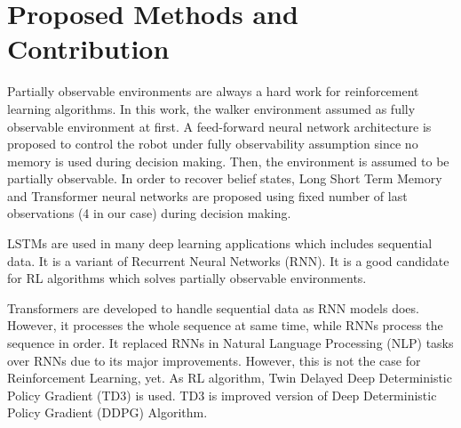 \section{Proposed Methods and Contribution}
\label{sec:proposed_methods}

Partially observable environments are always a hard work for reinforcement learning algorithms. 
In this work, the walker environment assumed as fully observable environment at first. 
A feed-forward neural network architecture is proposed to control 
the robot under fully observability assumption since no memory is used during decision making. 
Then, the environment is assumed to be partially observable. 
In order to recover belief states, Long Short Term Memory and 
Transformer neural networks are proposed using fixed number of 
last observations (4 in our case) during decision making. 

LSTMs are used in many deep learning applications which includes sequential data. 
It is a variant of Recurrent Neural Networks (RNN). 
It is a good candidate for RL algorithms which solves partially observable environments. 

Transformers are developed to handle sequential data as RNN models does. 
However, it processes the whole sequence at same time, while RNNs process the sequence in order. 
It replaced RNNs in Natural Language Processing (NLP) tasks over RNNs due to its major improvements. 
However, this is not the case for Reinforcement Learning, yet.
As RL algorithm, Twin Delayed Deep Deterministic Policy Gradient (TD3) is used. 
TD3 is improved version of Deep Deterministic Policy Gradient (DDPG) Algorithm.
